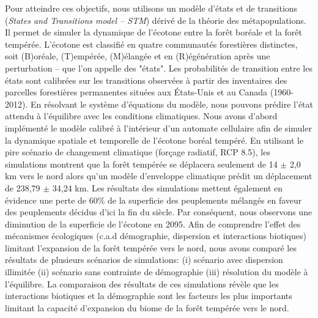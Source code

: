 Pour atteindre ces objectifs, nous utilisons un modèle d'états et de transitions (\textit{States and
Transitions model -- STM}) dérivé de la théorie des métapopulations. Il permet de simuler la
dynamique de l'écotone entre la forêt boréale et la forêt tempérée. L'écotone est classifié en
quatre communautés forestières distinctes, soit (B)oréale, (T)empérée, (M)élangée et en
(R)égénération après une perturbation -- que l'on appelle des "états". Les probabilités de
transition entre les états sont calibrées sur les transitions observées à partir des inventaires des
parcelles forestières permanentes situées aux États-Unis et au Canada (1960-2012). En résolvant le
système d'équations du modèle, nous pouvons prédire l'état attendu à l'équilibre avec les conditions
climatiques. Nous avons d'abord implémenté le modèle calibré à l'intérieur d'un automate cellulaire
afin de simuler la dynamique spatiale et temporelle de l'écotone boréal tempéré. En utilisant le
pire scénario de changement climatique (forçage radiatif, RCP 8.5), les simulations montrent que la
forêt tempérée se déplacera seulement de 14 $\pm$ 2,0 km vers le nord alors qu'un modèle d'enveloppe
climatique prédit un déplacement de 238,79 $\pm$ 34,24 km. Les résultats des simulations mettent
également en évidence une perte de 60\% de la superficie des peuplements mélangés en faveur des
peuplements décidus d’ici la fin du siècle. Par conséquent, nous observons une diminution de la
superficie de l'écotone en 2095. Afin de comprendre l'effet des mécanismes écologiques (c.a.d
démographie, dispersion et interactions biotiques) limitant l'expansion de la forêt tempérée vers le
nord, nous avons comparé les résultats de plusieurs scénarios de simulations: (i) scénario avec
dispersion illimitée (ii) scénario sans contrainte de démographie (iii) résolution du modèle à
l'équilibre. La comparaison des résultats de ces simulations révèle que les interactions biotiques
et la démographie sont les facteurs les plus importants limitant la capacité d'expansion du biome de
la forêt tempérée vers le nord.
